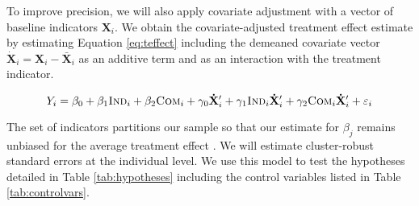 \documentclass[11pt, a4paper]{article}\usepackage[]{graphicx}\usepackage[]{color}
\begin{document}
        To improve precision, we will also apply covariate adjustment with a vector of baseline indicators $\mathbf{X}_i$. We obtain the covariate-adjusted treatment effect estimate by estimating Equation \ref{eq:teffect} including the demeaned covariate vector $\mathbf{\dot X}_{i} = \mathbf{X}_{i} - \mathbf{\bar X}_{i}$ as an additive term and as an interaction with the treatment indicator.

        \begin{equation} \label{eq:controls}
            Y_{i} = \beta_{0} + \beta_{1}\text{\textsc{Ind}}_{i} + \beta_{2}\text{\textsc{Com}}_{i} + \gamma_{0} \mathbf{\dot X}'_i + \gamma_{1}\text{\textsc{Ind}}_{i} \mathbf{\dot X}'_i + \gamma_{2}\text{\textsc{Com}}_{i} \mathbf{\dot X}'_i + \varepsilon_{i}
        \end{equation}

        The set of indicators partitions our sample so that our estimate for $\beta_j$ remains unbiased for the average treatment effect \parencite{lin_agnostic_2013}. We will estimate cluster-robust standard errors at the individual level. We use this model to test the hypotheses detailed in Table \ref{tab:hypotheses} including the control variables listed in Table \ref{tab:controlvars}.

        \begin{table}[h]
        \centering
        \caption{Control variables for covariate adjustment}
        \label{tab:controlvars}
        \end{table}
\end{document}
